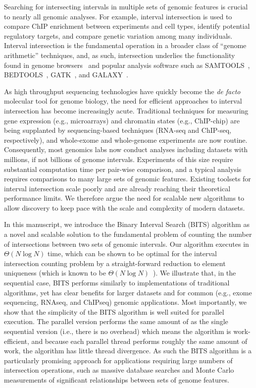 \documentclass{bioinfo}
\begin{document}
Searching for intersecting intervals in multiple sets of genomic features is
crucial to nearly all genomic analyses. For example, interval intersection is
used to compare ChIP enrichment between experiments and cell types, identify
potential regulatory targets, and compare genetic variation among many
individuals.  Interval intersection is the fundamental operation in a broader
class of ``genome arithmetic'' techniques, and, as such, intersection underlies
the functionality found in genome browsers~\citep{kent2002,robinson2011} and
popular analysis software such as SAMTOOLS~\citep{li2009},
BEDTOOLS~\citep{quinlan2010}, GATK~\citep{mckenna2010}, and
GALAXY~\citep{giardine2005}.

As high throughput sequencing technologies have quickly become the 
\emph{de facto} molecular tool for genome biology, the need for efficient
approaches to interval intersection has become increasingly acute. Traditional
techniques for measuring gene expression (e.g., microarrays) and chromatin
states (e.g., ChIP-chip) are being supplanted by sequencing-based techniques
(RNA-seq and ChIP-seq, respectively), and whole-exome and whole-genome
experiments are now routine. Consequently, most genomics labs now conduct
analyses including datasets with millions, if not billions of genome intervals.
Experiments of this size require substantial computation time per pair-wise
comparison, and a typical analysis requires comparisons to many large sets of
genomic features. Existing toolsets for interval intersection scale poorly and
are already reaching their theoretical performance limits. We therefore argue
the need for scalable new algorithms to allow discovery to keep pace with the
scale and complexity of modern datasets.

In this manuscript, we introduce the Binary Interval Search (BITS) algorithm as
a novel and scalable solution to the fundamental problem of counting the number
of intersections between two sets of genomic intervals.  Our algorithm executes
in $\Theta(N \log N)$ time, which can be shown to be optimal for the interval
intersection counting problem by a straight-forward reduction to element
uniqueness (which is known to be $\Theta(N\log N)$~\citep{misra1982}).  We
illustrate that, in the  sequential case, BITS performs similarly to
implementations of traditional algorithms, yet has clear benefits for larger
datasets and for common (e.g., exome sequencing, RNAseq, and ChIPseq) genomic
applications.  Most importantly, we show that the simplicity of the BITS
algorithm is well suited for parallel execution.  The parallel version performs
the same amount of as the single sequential version (i.e., there is no overhead)
which means the algorithm is work-efficient, and because each parallel thread
performs roughly the same amount of work, the algorithm has little thread
divergence. As such the BITS algorithm is a particularly promising approach for
applications requiring large numbers of intersection operations, such as massive
database searches and Monte Carlo measurements of significant relationships
between sets of genome features.
\end{document}
